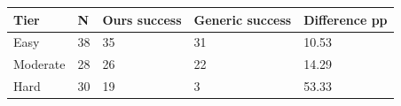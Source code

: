 \begin{tabular}{lllll}
\hline
Tier & N & Ours success & Generic success & Difference pp \\
\hline
Easy & 38 & 35 & 31 & 10.53 \\
Moderate & 28 & 26 & 22 & 14.29 \\
Hard & 30 & 19 & 3 & 53.33 \\
\hline
\end{tabular}
